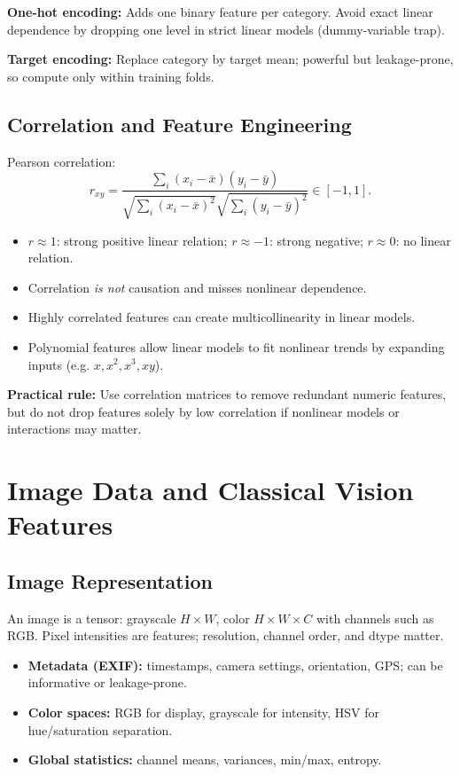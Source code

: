 \documentclass[10pt,twocolumn]{article}
\newcommand{\chead}[1]{\vspace{0.15em}\textbf{#1:} }
\begin{document}
\chead{One-hot encoding} Adds one binary feature per category. Avoid exact linear dependence by dropping one level in strict linear models (dummy-variable trap).\

\chead{Target encoding} Replace category by target mean; powerful but leakage-prone, so compute only within training folds.

\subsection{Correlation and Feature Engineering}
Pearson correlation:
\[
r_{xy}=\frac{\sum_i (x_i-\bar x)(y_i-\bar y)}{\sqrt{\sum_i (x_i-\bar x)^2}\sqrt{\sum_i (y_i-\bar y)^2}}\in[-1,1].
\]
\begin{itemize}
  \item $r\approx 1$: strong positive linear relation; $r\approx -1$: strong negative; $r\approx 0$: no linear relation.
  \item Correlation \emph{is not} causation and misses nonlinear dependence.
  \item Highly correlated features can create multicollinearity in linear models.
  \item Polynomial features allow linear models to fit nonlinear trends by expanding inputs (e.g. $x,x^2,x^3,xy$).
\end{itemize}
\chead{Practical rule} Use correlation matrices to remove redundant numeric features, but do not drop features solely by low correlation if nonlinear models or interactions may matter.

\section{Image Data and Classical Vision Features}
\subsection{Image Representation}
An image is a tensor: grayscale $H\times W$, color $H\times W\times C$ with channels such as RGB. Pixel intensities are features; resolution, channel order, and dtype matter.
\begin{itemize}
  \item \textbf{Metadata (EXIF):} timestamps, camera settings, orientation, GPS; can be informative or leakage-prone.
  \item \textbf{Color spaces:} RGB for display, grayscale for intensity, HSV for hue/saturation separation.
  \item \textbf{Global statistics:} channel means, variances, min/max, entropy.
\end{itemize}
\end{document}
